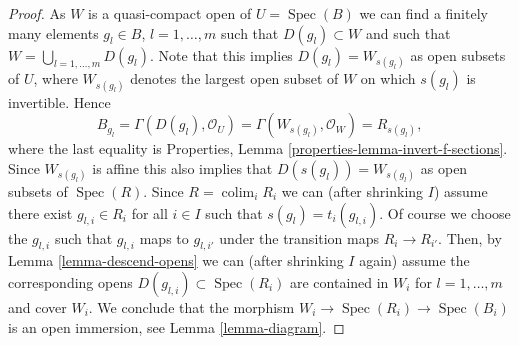 \documentclass{stacks-project}
\theoremstyle{plain}
\theoremstyle{definition}
\theoremstyle{remark}
\numberwithin{equation}{subsection}
\def\colim{\mathop{\mathrm{colim}}\nolimits}
\def\Spec{\mathop{\mathrm{Spec}}}
\begin{document}
\begin{proof}
\medskip\noindent
As $W$ is a quasi-compact open of $U = \Spec(B)$
we can find a finitely many elements $g_l \in B$, $l = 1, \ldots, m$
such that $D(g_l) \subset W$ and such that
$W = \bigcup_{l = 1, \ldots, m} D(g_l)$.
Note that this implies $D(g_l) = W_{s(g_l)}$ as open subsets of $U$,
where $W_{s(g_l)}$ denotes the largest open subset of $W$ on which
$s(g_l)$ is invertible. Hence
$$
B_{g_l} =
\Gamma(D(g_l), \mathcal{O}_U) =
\Gamma(W_{s(g_l)}, \mathcal{O}_W) = R_{s(g_l)},
$$
where the last equality is
Properties, Lemma \ref{properties-lemma-invert-f-sections}.
Since $W_{s(g_l)}$ is affine this also
implies that $D(s(g_l)) = W_{s(g_l)}$ as open subsets of $\Spec(R)$.
Since $R = \colim_i R_i$ we can (after shrinking $I$)
assume there exist $g_{l, i} \in R_i$ for all $i \in I$ such that
$s(g_l) = t_i(g_{l, i})$. Of course we choose the $g_{l, i}$
such that $g_{l, i}$ maps to $g_{l, i'}$ under the transition maps
$R_i \to R_{i'}$. Then, by Lemma \ref{lemma-descend-opens} we can
(after shrinking $I$ again)
assume the corresponding opens $D(g_{l, i}) \subset \Spec(R_i)$
are contained in $W_i$ for $l = 1, \ldots, m$ and cover $W_i$.
We conclude that the morphism $W_i \to \Spec(R_i) \to \Spec(B_i)$
is an open immersion, see Lemma \ref{lemma-diagram}.


\end{proof}
\end{document}
